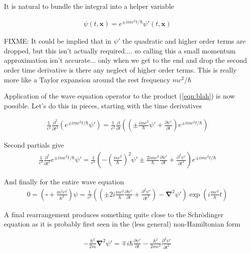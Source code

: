 \documentclass[]{eliblog}
\newcommand{\Bx}[0]{\mathbf{x}}
\newcommand{\spacegrad}[0]{\boldsymbol{\nabla}}
\newcommand{\delambertian}[0]{\square}
\newcommand{\inv}[1]{\frac{1}{#1}}
\begin{document}
It is natural to bundle the integral into a helper variable

\begin{align}\label{eqn:blah}
{\psi}(t,\Bx) = e^{\pm im c^2 t /\hbar} \psi'(t,\Bx)
\end{align}

FIXME: It could be implied that in $\psi'$ the quadratic and higher order terms are dropped, but this isn't actually required.... so calling this
a small momentum approximation isn't accurate... only when we get to the end and drop the second order time derivative is there any 
neglect of higher order terms.  This is really more like a Taylor expansion around the rest frequency $m c^2/\hbar$

Application of the wave equation operator to the product (\ref{eqn:blah}) is now possible.  Let's do this in pieces, starting with the 
time derivatives

\begin{align}
\inv{c^2}\frac{\partial^2}{\partial t^2} \left( e^{\pm im c^2 t /\hbar} \psi' \right)
=
\inv{c^2}\frac{\partial}{\partial t} 
\left( \left( \pm \frac{i m c^2}{\hbar} \psi' + \frac{\partial \psi'}{\partial t} \right) e^{\pm im c^2 t /\hbar} \right)
\end{align}

Second partials give
\begin{align}
\inv{c^2}\frac{\partial^2}{\partial t^2} e^{\pm im c^2 t /\hbar} \psi'
=
\inv{c^2}
\left( - \left(\frac{m c^2}{\hbar}\right)^2 \psi' \pm \frac{2 i m c^2}{\hbar} \frac{\partial \psi'}{\partial t} + \frac{\partial^2 \psi'}{\partial t^2} \right) e^{\pm im c^2 t /\hbar} 
\end{align}

And finally for the entire wave equation
\begin{align}
0 = \left( \delambertian + \frac{m^2 c^2}{\hbar^2} \right) \psi
=
\frac{1}{c^2}
\left(
\left( 
\pm 2 i \frac{m c^2}{\hbar} \frac{\partial \psi'}{\partial t} +
\frac{\partial^2 \psi'}{\partial t^2}
\right)
-
\spacegrad^2 \psi'
\right)
\exp\left( i \frac{m c^2}{\hbar} t \right)
\end{align}

A final rearrangement produces something quite close to the Schr\"{o}dinger equation as it is probably first seen in the (less general) non-Hamiltonian form

\begin{align}
-\frac{\hbar^2}{2m} \spacegrad^2 \psi' = \mp i \hbar \frac{\partial \psi'}{\partial t} -\frac{\hbar^2}{2m c^2} \frac{\partial^2 \psi'}{\partial t^2}
\end{align}
\end{document}
